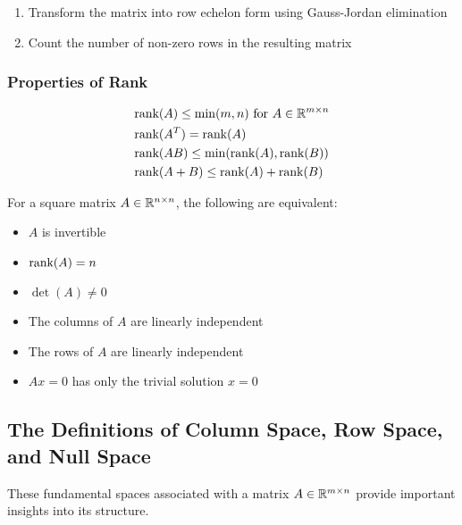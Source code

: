 \begin{enumerate}

    \item Transform the matrix into row echelon form using Gauss-Jordan elimination

    \item Count the number of non-zero rows in the resulting matrix

\end{enumerate}

\subsubsection{Properties of Rank}

\begin{align*}
    &\text{rank}(A) \leq \min(m,n) \text{ for } A \in \mathbb{R}^{m \times n} \\
    &\text{rank}(A^T) = \text{rank}(A) \\
    &\text{rank}(AB) \leq \min(\text{rank}(A), \text{rank}(B)) \\
    &\text{rank}(A+B) \leq \text{rank}(A) + \text{rank}(B)
\end{align*}

For a square matrix \(A \in \mathbb{R}^{n \times n}\), the following are equivalent:

\begin{itemize}

    \item \(A\) is invertible

    \item \(\text{rank}(A) = n\)

    \item \(\det(A) \neq 0\)

    \item The columns of \(A\) are linearly independent

    \item The rows of \(A\) are linearly independent

    \item \(Ax = 0\) has only the trivial solution \(x = 0\)

\end{itemize}

\subsection{The Definitions of Column Space, Row Space, and Null Space}

These fundamental spaces associated with a matrix \(A \in \mathbb{R}^{m \times n}\) provide important insights into its structure.


